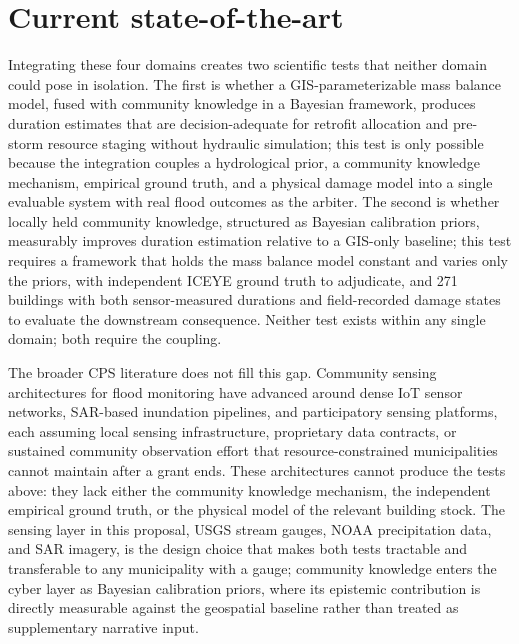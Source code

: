 \documentclass[11pt]{article}
\begin{document}

\vspace{-5pt}
\section{Current state-of-the-art}

Integrating these four domains creates two scientific tests that neither domain
could pose in isolation.
The first is whether a GIS-parameterizable mass balance model, fused with community
knowledge in a Bayesian framework, produces duration estimates that are
decision-adequate for retrofit allocation and pre-storm resource staging without
hydraulic simulation; this test is only possible because the integration couples a
hydrological prior, a community knowledge mechanism, empirical ground truth, and a
physical damage model into a single evaluable system with real flood outcomes as the
arbiter.
The second is whether locally held community knowledge, structured as Bayesian
calibration priors, measurably improves duration estimation relative to a GIS-only
baseline; this test requires a framework that holds the mass balance model constant
and varies only the priors, with independent ICEYE ground truth to adjudicate, and
271 buildings with both sensor-measured durations and field-recorded damage states
to evaluate the downstream consequence.
Neither test exists within any single domain; both require the coupling.

The broader CPS literature does not fill this gap.
Community sensing architectures for flood monitoring have advanced around dense IoT
sensor networks, SAR-based inundation pipelines, and participatory sensing platforms, each assuming local sensing infrastructure, proprietary data contracts, or sustained
community observation effort that resource-constrained municipalities cannot maintain
after a grant ends.
These architectures cannot produce the tests above: they lack either the community
knowledge mechanism, the independent empirical ground truth, or the physical model
of the relevant building stock.
The sensing layer in this proposal, USGS stream gauges, NOAA precipitation data, and SAR imagery, is the
design choice that makes both tests tractable and transferable to any municipality with
a gauge; community knowledge enters the cyber layer as Bayesian calibration priors,
where its epistemic contribution is directly measurable against the geospatial baseline
rather than treated as supplementary narrative input.
\end{document}
